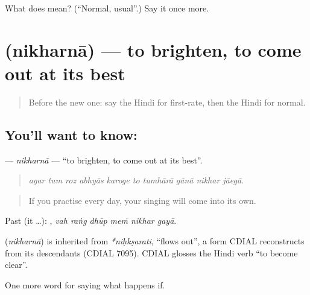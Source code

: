 \begin{tcolorbox}[breakable,colback=teal!4,colframe=teal!35!black,title={Before you move on}]
What does  mean? (\textquotedblleft{}Normal, usual\textquotedblright{}.) Say it once more.
\end{tcolorbox}
\section[\texorpdfstring{\hi{निखरना} (nikharnā)}{निखरना (nikharnā)}]{ (nikharnā) — to brighten, to come out at its best}

\label{lesson:HI-C389-nikharna}



\begin{quote}
Before the new one: say the Hindi for first-rate, then the Hindi for normal.
\end{quote}

\subsection*{You'll want to know: }
\textbf{} — \emph{nikharnā} — \textquotedblleft{}to brighten, to come out at its best\textquotedblright{}.

\begin{quote}
         
\end{quote}

\begin{quote}
\emph{agar tum roz abhyās karoge to tumhārā gānā nikhar jāegā.}
\end{quote}

\begin{quote}
If you practise every day, your singing will come into its own.
\end{quote}

Past (it …):      , \emph{vah raṅg dhūp meṁ nikhar gayā}.

\begin{cousinweb}
\textbf{} (\emph{nikharnā}) is inherited from \emph{*niḥkṣarati}, \textquotedblleft{}flows out\textquotedblright{}, a form CDIAL reconstructs from its descendants (CDIAL 7095). CDIAL glosses the Hindi verb \textquotedblleft{}to become clear\textquotedblright{}.
\end{cousinweb}

\begin{grammarlens}[title={What you've built}]
One more word for saying what happens if.
\end{grammarlens}

